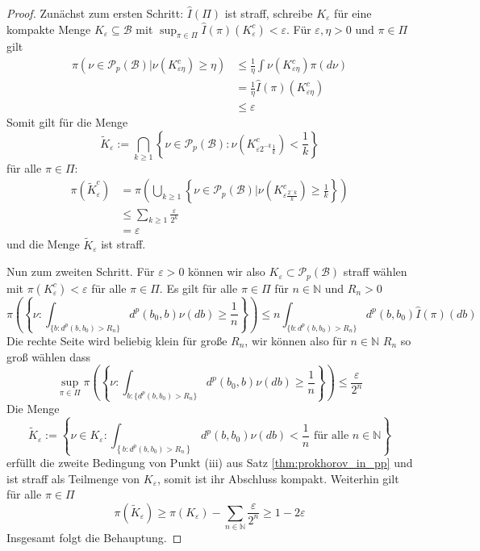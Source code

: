 \begin{proof}
    Zunächst zum ersten Schritt: $\hat{I}(\Pi)$ ist straff, schreibe $K_\varepsilon$ für eine kompakte Menge $K_\varepsilon \subseteq \mathcal{B}$ mit $\sup_{\pi \in \Pi} \hat{I}(\pi)(K_\varepsilon^c) < \varepsilon$. Für $\varepsilon, \eta>0$ und $\pi \in \Pi$ gilt
    \begin{align*}
        \pi\left( \nu \in \mathcal{P}_p(\mathcal{B})\vert \nu(K_{\varepsilon\eta}^c) \geq \eta\right) &\leq \frac{1}{\eta} \int \nu(K_{\varepsilon\eta}^c) \pi(d\nu) \\
        &= \frac{1}{\eta} \hat{I}(\pi)(K_{\varepsilon\eta}^c) \\
        &\leq \varepsilon
    \end{align*}
    Somit gilt für die Menge 
    $$\tilde{K}_\varepsilon := \bigcap_{k\geq 1} \left\{ \nu \in \mathcal{P}_p(\mathcal{B}): \nu(K_{\varepsilon 2^{-k} \frac{1}{k}}^c) < \frac{1}{k}\right\}$$
    für alle $\pi \in \Pi$:
    \begin{align*}
        \pi(\tilde{K}_\varepsilon^c) &= \pi\left(\bigcup_{k\geq 1}\left\{\nu \in \mathcal{P}_p(\mathcal{B}) \vert \nu(K_{\varepsilon\frac{2^-k}{k}}^c) \geq \frac{1}{k}\right\} \right) \\
        &\leq \sum_{k\geq 1} \frac{\varepsilon}{2^k} \\
        &= \varepsilon
    \end{align*}
    und die Menge $\tilde{K}_\varepsilon$ ist straff. 

    Nun zum zweiten Schritt. Für $\varepsilon>0$ können wir also $K_\varepsilon \subset \mathcal{P}_p(\mathcal{B})$ straff wählen mit $\pi(K_\varepsilon^c)<\varepsilon$ für alle $\pi \in \Pi$.
    Es gilt für alle $\pi \in \Pi$ für $n\in\mathbb{N}$ und $R_n>0$
    $$\pi\left(\left\{ \nu: \int_{\{b: d^p(b,b_0)>R_n\}} d^p(b_0, b) \nu(db) \geq \frac{1}{n}\right\}\right) \leq n \int_{\{b:d^p(b,b_0)>R_n\}} d^p(b, b_0) \hat{I}(\pi)(db)$$
    Die rechte Seite wird beliebig klein für große $R_n$, wir können also für $n\in \mathbb{N}$ $R_n$ so groß wählen dass
    $$\sup_{\pi \in \Pi} \pi\left(\left\{ \nu: \int_{b:\{d^p(b,b_0)>R_n\}} d^p(b_0, b) \nu(db) \geq \frac{1}{n}\right\}\right) \leq \frac{\varepsilon}{2^n}$$
    Die Menge
    $$\tilde{K}_\varepsilon := \left\{ \nu \in K_\varepsilon: \int_{\left\{b: d^p(b, b_0)>R_n\right\}}d^p(b, b_0) \nu(db) < \frac{1}{n} \text{ für alle }n \in \mathbb{N}\right\}$$
    erfüllt die zweite Bedingung von Punkt (iii) aus Satz \ref{thm:prokhorov_in_pp} und ist straff als Teilmenge von $K_\varepsilon$, somit ist ihr Abschluss kompakt. Weiterhin gilt für alle $\pi \in \Pi$
    $$\pi(\tilde{K}_\varepsilon) \geq \pi(K_\varepsilon) - \sum_{n\in\mathbb{N}} \frac{\varepsilon}{2^n} \geq 1 - 2\varepsilon$$
    Insgesamt folgt die Behauptung.
\end{proof}
